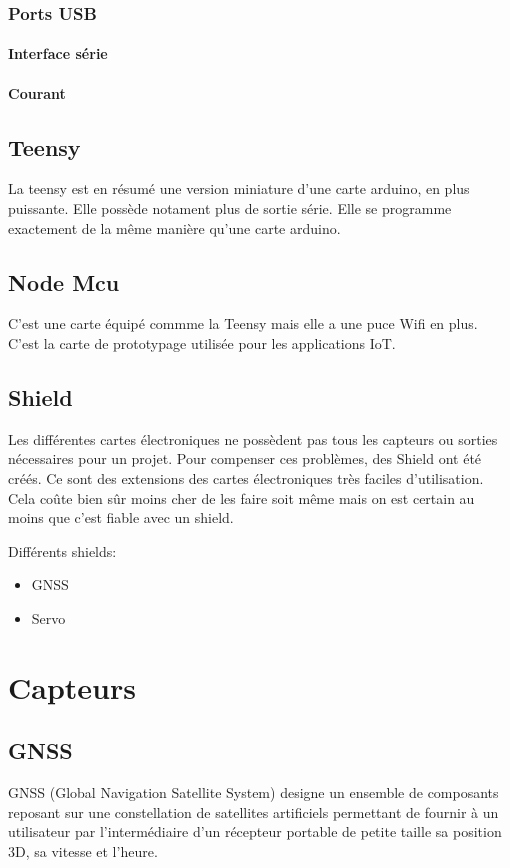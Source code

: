 \documentclass[a4paper, 11pt]{report}
\begin{document}
\subsection{Ports USB}

\subsubsection{Interface série}

\subsubsection{Courant}

\section{Teensy}
La teensy est en résumé une version miniature d'une carte arduino, en plus puissante. Elle possède notament plus de sortie série. Elle se programme exactement de la même manière qu'une carte arduino.

\section{Node Mcu}
C'est une carte équipé commme la Teensy mais elle a une puce Wifi en plus. C'est la carte de prototypage utilisée pour les applications IoT.



\section{Shield}
Les différentes cartes électroniques ne possèdent pas tous les capteurs ou sorties nécessaires pour un projet. Pour compenser ces problèmes, des Shield ont été créés. Ce sont des extensions des cartes électroniques très faciles d'utilisation. Cela coûte bien sûr moins cher de les faire soit même mais on est certain au moins que c'est fiable avec un shield.

Différents shields:
\begin{itemize}
\item GNSS
\item Servo
\end{itemize}

\chapter{Capteurs}

\section{GNSS}
GNSS (Global Navigation Satellite System)  designe un ensemble de composants reposant sur une constellation de satellites artificiels permettant de fournir à un utilisateur par l’intermédiaire d'un récepteur portable de petite taille sa position 3D, sa vitesse et l'heure.
\end{document}
